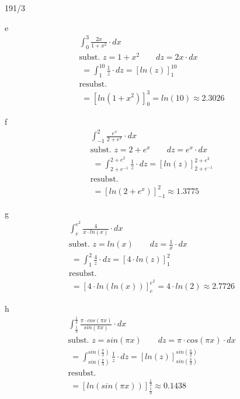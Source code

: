 \begin{exercise}{191/3}
  \item [e]
  \begin{gather*}
    \int_0^3 \frac{2x}{1 + x^2} \cdot dx \\
    \text{subst. } z = 1 + x^2 \qquad dz = 2x \cdot dx \\
    \;= \int_1^{10} \frac{1}{z} \cdot dz = \left[ln(z)\right]_1^{10} \\
    \text{resubst.} \\
    \;= \left[ln(1 + x^2)\right]_0^3 = ln(10) \approx 2.3026
  \end{gather*}
  \item [f]
  \begin{gather*}
    \int_{-1}^2 \frac{e^x}{2 + e^x} \cdot dx \\
    \text{subst. } z = 2 + e^x \qquad dz = e^x \cdot dx \\
    \;= \int_{2 + e^{-1}}^{2 + e^2} \frac{1}{z} \cdot dz = \left[ln(z)\right]_{2 + e^{-1}}^{2 + e^2} \\
    \text{resubst.} \\
    \;= \left[ln(2 + e^x)\right]_{-1}^2 \approx 1.3775
  \end{gather*}
  \item [g]
  \begin{gather*}
    \int_e^{e^2} \frac{4}{x \cdot ln(x)} \cdot dx \\
    \text{subst. } z = ln(x) \qquad dz = \frac{1}{x} \cdot dx \\
    \;= \int_1^2 \frac{4}{z} \cdot dz = \left[4 \cdot ln(z)\right]_1^2 \\
    \text{resubst.} \\
    \;= \left[4 \cdot ln(ln(x))\right]_e^{e^2} = 4 \cdot ln(2) \approx 2.7726
  \end{gather*}
  \item [h]
  \begin{gather*}
    \int_\frac{1}{3}^\frac{1}{2} \frac{\pi \cdot cos(\pi x)}{sin(\pi x)} \cdot dx \\
    \text{subst. } z = sin(\pi x) \qquad dz = \pi \cdot cos(\pi x) \cdot dx \\
    \;= \int_{sin(\frac{\pi}{3})}^{sin(\frac{\pi}{2})} \frac{1}{z} \cdot dz = \left[ln(z)\right]_{sin(\frac{\pi}{3})}^{sin(\frac{\pi}{2})} \\
    \text{resubst.} \\
    \;= \left[ln(sin(\pi x))\right]_\frac{1}{3}^\frac{1}{2} \approx 0.1438
  \end{gather*}
\end{exercise}
